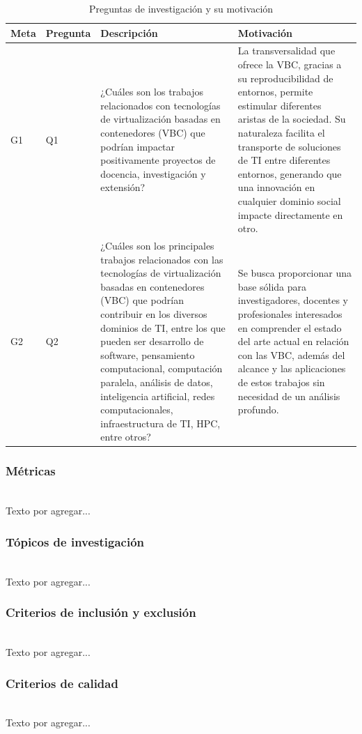 \begin{table}[htpb]
\centering
\caption{Preguntas de investigación y su motivación}
\renewcommand{\arraystretch}{1.4}
\begin{tabularx}{\textwidth}{>{\hsize=0.5\hsize}X >{\hsize=0.6\hsize}X >{\hsize=1.5\hsize}X >{\hsize=2\hsize}X}
\toprule
\textbf{Meta} & \textbf{Pregunta} & \textbf{Descripción} & \textbf{Motivación} \\
\midrule
G1 & Q1 & ¿Cuáles son los trabajos relacionados con tecnologías de virtualización basadas en contenedores (VBC) que podrían impactar positivamente proyectos de docencia, investigación y extensión? & La transversalidad que ofrece la VBC, gracias a su reproducibilidad de entornos, permite estimular diferentes aristas de la sociedad. Su naturaleza facilita el transporte de soluciones de TI entre diferentes entornos, generando que una innovación en cualquier dominio social impacte directamente en otro. \\
\midrule
G2 & Q2 & ¿Cuáles son los principales trabajos relacionados con las tecnologías de virtualización basadas en contenedores (VBC) que podrían contribuir en los diversos dominios de TI, entre los que pueden ser desarrollo de software, pensamiento computacional, computación paralela, análisis de datos, inteligencia artificial, redes computacionales, infraestructura de TI, HPC, entre otros? & Se busca proporcionar una base sólida para investigadores, docentes y profesionales interesados en comprender el estado del arte actual en relación con las VBC, además del alcance y las aplicaciones de estos trabajos sin necesidad de un análisis profundo. \\
\bottomrule
\end{tabularx}\label{tab:preguntas}
\end{table}

\subsubsection{Métricas}
\mbox{}\\
Texto por agregar...

\subsubsection{Tópicos de investigación}
\mbox{}\\
Texto por agregar...

\subsubsection{Criterios de inclusión y exclusión}
\mbox{}\\
Texto por agregar...

\subsubsection{Criterios de calidad}
\mbox{}\\
Texto por agregar...
